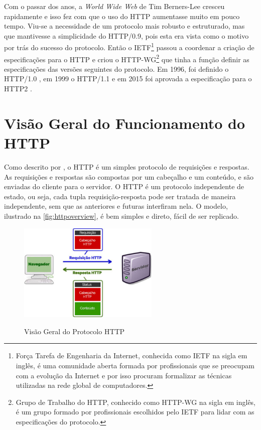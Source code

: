 Com o passar dos anos, a \textit{World Wide Web} de Tim Berners-Lee cresceu rapidamente e isso fez com que o uso do HTTP aumentasse muito em pouco tempo. Viu-se a necessidade de um protocolo mais robusto e estruturado, mas que mantivesse a simplicidade do HTTP/0.9, pois esta era vista como o motivo por trás do sucesso do protocolo. Então o IETF\footnote{Força Tarefa de Engenharia da Internet, conhecida como IETF na sigla em inglês, é uma comunidade aberta formada por profissionais que se preocupam com a evolução da Internet e por isso procuram formalizar as técnicas utilizadas na rede global de computadores.} passou a coordenar a criação de especificações para o HTTP e criou o HTTP-WG\footnote{Grupo de Trabalho do HTTP, conhecido como HTTP-WG na sigla em inglês, é um grupo formado por profissionais escolhidos pelo IETF para lidar com as especificações do protocolo.} que tinha a função definir as especificações das versões seguintes do protocolo. Em 1996, foi definido o HTTP/1.0 \cite{RFC1945}, em 1999 o HTTP/1.1 \cite{RFC2616} e em 2015 foi aprovada a especificação para o HTTP2 \cite{HTTP2Spec}.

\section{Visão Geral do Funcionamento do HTTP}
\label{sec:http_visão_geral}

Como descrito por , o HTTP é um simples protocolo de requisições e respostas. As requisições e respostas são compostas por um cabeçalho e um conteúdo, e são enviadas do cliente para o servidor. O HTTP é um protocolo independente de estado, ou seja, cada tupla requisição-resposta pode ser tratada de maneira independente, sem que as anteriores e futuras interfiram nela. O modelo, ilustrado na \autoref{fig:httpoverview}, é bem simples e direto, fácil de ser replicado.

\begin{figure}[!htb]
    \centering
    \caption{Visão Geral do Protocolo HTTP}
    \includegraphics[width=0.6\textwidth]{./04-figuras/fund-teorica/http_overview}
    \label{fig:httpoverview}
\end{figure}

